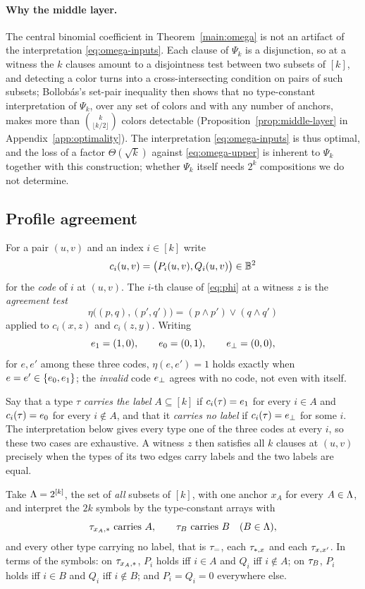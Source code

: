 \paragraph{Why the middle layer.}
The central binomial coefficient in Theorem~\ref{main:omega} is not an
artifact of the interpretation \eqref{eq:omega-inputs}. Each clause of
$\Psi_k$ is a disjunction, so at a witness the $k$ clauses amount to a
disjointness test between two subsets of $[k]$, and detecting a color turns
into a cross-intersecting condition on pairs of such subsets; Bollob\'as's
set-pair inequality then shows that no type-constant interpretation of
$\Psi_k$, over any set of colors and with any number of anchors, makes more
than $\binom{k}{\lfloor k/2\rfloor}$ colors detectable
(Proposition~\ref{prop:middle-layer} in Appendix~\ref{app:optimality}).
The interpretation \eqref{eq:omega-inputs} is thus optimal, and the loss of
a factor $\Theta(\sqrt k)$ against \eqref{eq:omega-upper} is inherent to
$\Psi_k$ together with this construction; whether $\Psi_k$ itself needs
$2^k$ compositions we do not determine.

\subsection{Profile agreement}\label{sec:phi}
For a pair $(u,v)$ and an index $i\in[k]$ write
\[
 c_i(u,v)=\bigl(P_i(u,v),Q_i(u,v)\bigr)\in\mathbb B^2
\]
for the \emph{code} of $i$ at $(u,v)$. The $i$-th clause of \eqref{eq:phi}
at a witness $z$ is the \emph{agreement test}
\begin{equation}\label{eq:eta}
 \eta\bigl((p,q),(p',q')\bigr)=(p\land p')\lor(q\land q')
\end{equation}
applied to $c_i(x,z)$ and $c_i(z,y)$. Writing
\[
 e_{1}=(1,0),\qquad e_{0}=(0,1),\qquad e_{\bot}=(0,0),
\]
for $e,e'$ among these three codes, $\eta(e,e')=1$ holds exactly when
$e=e'\in\{e_{0},e_{1}\}$; the \emph{invalid} code $e_{\bot}$ agrees with no code,
not even with itself.

Say that a type $\tau$ \emph{carries the label} $A\subseteq[k]$ if
$c_i(\tau)=e_{1}$ for every $i\in A$ and $c_i(\tau)=e_{0}$ for every
$i\notin A$, and that it \emph{carries no label} if $c_i(\tau)=e_{\bot}$ for
some $i$. The interpretation below gives every type one of the three codes
at every $i$, so these two cases are exhaustive. A witness $z$ then
satisfies all $k$ clauses at $(u,v)$ precisely
when the types of its two edges carry labels and the two labels are equal.

Take $\Lambda=2^{[k]}$, the set of \emph{all} subsets of $[k]$, with one anchor
$x_A$ for every $A\in\Lambda$, and interpret the $2k$ symbols by the
type-constant arrays with
\begin{equation}\label{eq:phi-inputs}
 \tau_{x_A,\ast}\ \text{carries}\ A,\qquad
 \tau_{B}\ \text{carries}\ B\quad(B\in\Lambda),
\end{equation}
and every other type carrying no label, that is $\tau_{=}$, each $\tau_{\ast,x}$ and
each $\tau_{x,x'}$. In terms of the symbols: on $\tau_{x_A,\ast}$, $P_i$ holds iff
$i\in A$ and $Q_i$ iff $i\notin A$; on $\tau_{B}$, $P_i$ holds iff $i\in B$
and $Q_i$ iff $i\notin B$; and $P_i=Q_i=0$ everywhere else.

